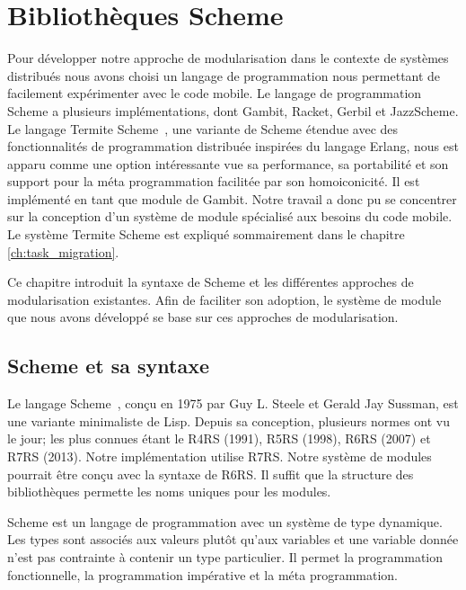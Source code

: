 
\chapter{Bibliothèques Scheme}
\label{ch:scheme_concepts}

Pour développer notre approche de modularisation dans le contexte de systèmes
distribués nous avons choisi un langage de programmation nous permettant de
facilement expérimenter avec le code mobile. Le langage de programmation Scheme
a plusieurs implémentations, dont Gambit, Racket\cite{Racket},
Gerbil\cite{Gerbil} et JazzScheme\cite{JazzScheme}.  Le langage Termite
Scheme~\cite{DBLP:conf/erlang/Germain06}, une variante de Scheme étendue avec
des fonctionnalités de programmation distribuée inspirées du langage Erlang,
nous est apparu comme une option intéressante vue sa performance, sa
portabilité et son support pour la méta programmation facilitée par son
homoiconicité. Il est implémenté en tant que module de Gambit. Notre travail a
donc pu se concentrer sur la conception d'un système de module spécialisé aux
besoins du code mobile. Le système Termite Scheme est expliqué sommairement
dans le chapitre \ref{ch:task_migration}.

Ce chapitre introduit la syntaxe de Scheme et les différentes
approches de modularisation existantes.  Afin de faciliter son
adoption, le système de module que nous avons développé se base sur
ces approches de modularisation.


\section{Scheme et sa syntaxe}

Le langage Scheme~\cite{Clinger:2008:SCH:1529966.1529973}, conçu en 1975 par
Guy L. Steele et Gerald Jay Sussman, est une variante minimaliste de Lisp.
Depuis sa conception, plusieurs normes ont vu le jour; les plus connues étant
le R4RS (1991), R5RS (1998), R6RS (2007) et R7RS (2013). Notre implémentation
utilise R7RS. Notre système de modules pourrait être conçu avec la syntaxe de
R6RS. Il suffit que la structure des bibliothèques permette les noms uniques
pour les modules.

Scheme est un langage de programmation avec un
système de type dynamique.  Les types sont associés aux valeurs plutôt qu'aux
variables et une variable donnée n'est pas contrainte à contenir un type
particulier.  Il permet la programmation fonctionnelle, la programmation
impérative et la méta programmation.

